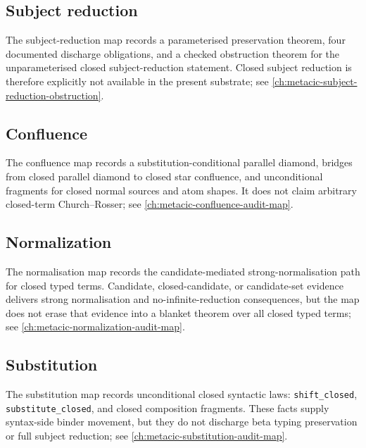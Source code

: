 \subsection{Subject reduction}
\label{subsec:metacic-audit-synthesis-subject-reduction}

The subject-reduction map records a parameterised preservation theorem,
four documented discharge obligations, and a checked obstruction theorem for
the unparameterised closed subject-reduction statement. Closed subject
reduction is therefore explicitly not available in the present substrate; see
\autoref{ch:metacic-subject-reduction-obstruction}.

\subsection{Confluence}
\label{subsec:metacic-audit-synthesis-confluence}

The confluence map records a substitution-conditional parallel diamond,
bridges from closed parallel diamond to closed star confluence, and
unconditional fragments for closed normal sources and atom shapes. It does not
claim arbitrary closed-term Church--Rosser; see
\autoref{ch:metacic-confluence-audit-map}.

\subsection{Normalization}
\label{subsec:metacic-audit-synthesis-normalization}

The normalisation map records the candidate-mediated strong-normalisation path
for closed typed terms. Candidate, closed-candidate, or candidate-set evidence
delivers strong normalisation and no-infinite-reduction consequences, but the
map does not erase that evidence into a blanket theorem over all closed typed
terms; see \autoref{ch:metacic-normalization-audit-map}.

\subsection{Substitution}
\label{subsec:metacic-audit-synthesis-substitution}

The substitution map records unconditional closed syntactic laws:
\texttt{shift\_closed}, \texttt{substitute\_closed}, and closed composition
fragments. These facts supply syntax-side binder movement, but they do not
discharge beta typing preservation or full subject reduction; see
\autoref{ch:metacic-substitution-audit-map}.

